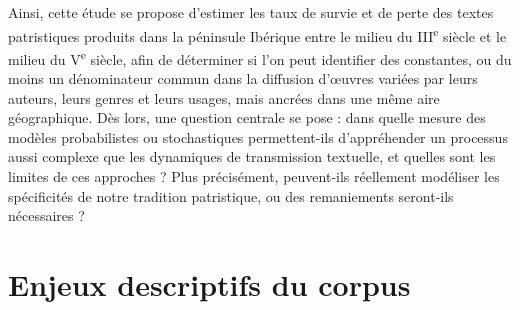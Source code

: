 \documentclass[a4paper,twoside,12pt]{book}
\begin{document}
Ainsi, cette étude se propose d’estimer les taux de survie et de perte des textes patristiques produits dans la péninsule Ibérique entre le milieu du III\textsuperscript{e} siècle et le milieu du V\textsuperscript{e} siècle, afin de déterminer si l’on peut identifier des constantes, ou du moins un dénominateur commun dans la diffusion d’œuvres variées par leurs auteurs, leurs genres et leurs usages, mais ancrées dans une même aire géographique.
Dès lors, une question centrale se pose : dans quelle mesure des modèles probabilistes ou stochastiques permettent-ils d’appréhender un processus aussi complexe que les dynamiques de transmission textuelle, et quelles sont les limites de ces approches ? Plus précisément, peuvent-ils réellement modéliser les spécificités de notre tradition patristique, ou des remaniements seront-ils nécessaires ? 

\newpage









\nocite{*}
\printbibliography[heading=subbibliography, title={Bibliographie}]


\mainmatter


\section{Enjeux descriptifs du corpus}
\end{document}
